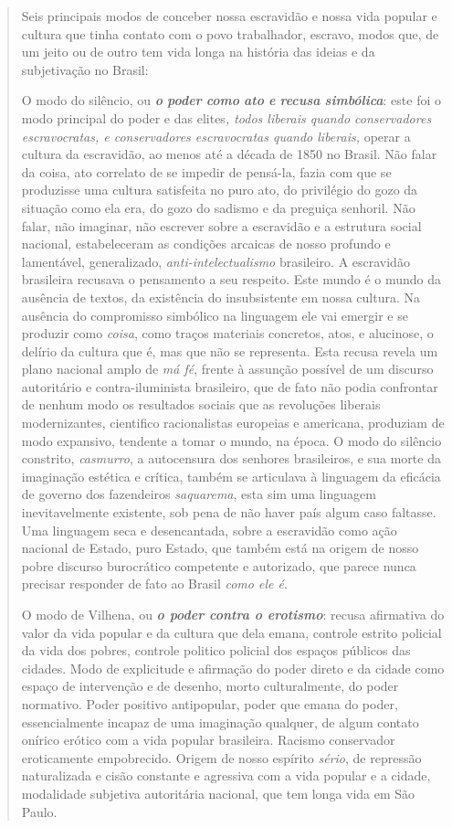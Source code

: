\begin{quote}
Seis principais modos de conceber nossa escravidão e nossa vida popular
e cultura que tinha contato com o povo trabalhador, escravo, modos que,
de um jeito ou de outro tem vida longa na história das ideias e da
subjetivação no Brasil:

O modo do silêncio, ou \emph{\textbf{o} \textbf{poder} \textbf{como}
\textbf{ato} \textbf{e} \textbf{recusa} \textbf{simbólica}}: este foi o
modo principal do poder e das elites\emph{, todos liberais quando
conservadores escravocratas, e conservadores escravocratas quando
liberais,} operar a cultura da escravidão, ao menos até a década de 1850
no Brasil. Não falar da coisa, ato correlato de se impedir de pensá-la,
fazia com que se produzisse uma cultura satisfeita no puro ato, do
privilégio do gozo da situação como ela era, do gozo do sadismo e da
preguiça senhoril. Não falar, não imaginar, não escrever sobre a
escravidão e a estrutura social nacional, estabeleceram as condições
arcaicas de nosso profundo e lamentável, generalizado,
\emph{anti-intelectualismo} brasileiro. A escravidão brasileira recusava
o pensamento a seu respeito. Este mundo é o mundo da ausência de textos,
da existência do insubsistente em nossa cultura. Na ausência do
compromisso simbólico na linguagem ele vai emergir e se produzir como
\emph{coisa}, como traços materiais concretos, atos, e alucinose, o
delírio da cultura que é, mas que não se representa. Esta recusa revela
um plano nacional amplo de \emph{má fé}, frente à assunção possível de
um discurso autoritário e contra-iluminista brasileiro, que de fato não
podia confrontar de nenhum modo os resultados sociais que as revoluções
liberais modernizantes, cientifico racionalistas europeias e americana,
produziam de modo expansivo, tendente a tomar o mundo, na época. O modo
do silêncio constrito, \emph{casmurro}, a autocensura dos senhores
brasileiros, e sua morte da imaginação estética e crítica, também se
articulava à linguagem da eficácia de governo dos fazendeiros
\emph{saquarema}, esta sim uma linguagem inevitavelmente existente, sob
pena de não haver país algum caso faltasse. Uma linguagem seca e
desencantada, sobre a escravidão como ação nacional de Estado, puro
Estado, que também está na origem de nosso pobre discurso burocrático
competente e autorizado, que parece nunca precisar responder de fato ao
Brasil \emph{como ele é}.

O modo de Vilhena, ou \emph{\textbf{o poder contra o erotismo}}: recusa
afirmativa do valor da vida popular e da cultura que dela emana,
controle estrito policial da vida dos pobres, controle politico policial
dos espaços públicos das cidades. Modo de explicitude e afirmação do
poder direto e da cidade como espaço de intervenção e de desenho, morto
culturalmente, do poder normativo. Poder positivo antipopular, poder que
emana do poder, essencialmente incapaz de uma imaginação qualquer, de
algum contato onírico erótico com a vida popular brasileira. Racismo
conservador eroticamente empobrecido. Origem de nosso espírito
\emph{sério}, de repressão naturalizada e cisão constante e agressiva
com a vida popular e a cidade, modalidade subjetiva autoritária
nacional, que tem longa vida em São Paulo.


\end{quote}
